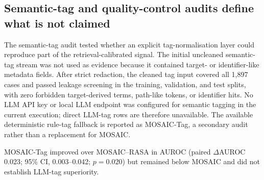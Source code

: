 \FloatBarrier

\subsection{Semantic-tag and quality-control audits define what is not claimed}
\label{subsec:semantic_tag_qc_results}

The semantic-tag audit tested whether an explicit tag-normalisation layer could reproduce part of the retrieval-calibrated signal. The initial uncleaned semantic-tag stream was not used as evidence because it contained target- or identifier-like metadata fields. After strict redaction, the cleaned tag input covered all 1,897 cases and passed leakage screening in the training, validation, and test splits, with zero forbidden target-derived terms, path-like tokens, or identifier hits. No LLM API key or local LLM endpoint was configured for semantic tagging in the current execution; direct LLM-tag rows are therefore unavailable. The available deterministic rule-tag fallback is reported as MOSAIC-Tag, a secondary audit rather than a replacement for MOSAIC.

\begin{table}[!htbp]
  \centering
  \caption{Semantic-tag audit and model-role boundary.}
  \label{tab:llm_specific_ablation}
  \scriptsize
  \begin{threeparttable}
  \begin{tablenotes}[flushleft]
    \footnotesize
    \item MOSAIC-Tag improved over MOSAIC--RASA in AUROC (paired \(\Delta\)AUROC 0.023; 95\% CI, 0.003--0.042; \(p=0.020\)) but remained below MOSAIC and did not establish LLM-tag superiority.
  \end{tablenotes}
  \end{threeparttable}
\end{table}

